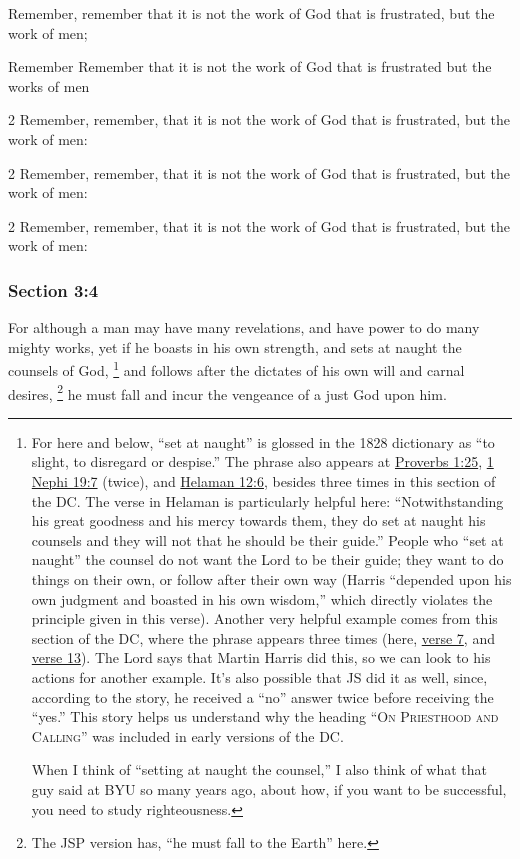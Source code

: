 		Remember, remember that it is not the work of God that is frustrated, but the work of men;

		\begin{framed}
		\scriptsize
			\begin{compactdesc}
				\item[JSP] Remember Remember that it is not the work of God that is frustrated but the works of men
				\item[BC] 2 Remember, remember, that it is not the work of God that is frustrated, but the work of men:
				\item[DC 1835] 2 Remember, remember, that it is not the work of God that is frustrated, but the work of men:
				\item[DC 1844] 2 Remember, remember, that it is not the work of God that is frustrated, but the work of men:
			\end{compactdesc}
		\end{framed}

	\subsubsection{Section 3:4} %
		\label{DC3-4}

		For although a man may have many revelations, and have power to do many mighty works, yet if he boasts in his own strength, and sets at naught the counsels of God,%
			\footnote{%
				For here and below, ``set at naught'' is glossed in the 1828 dictionary as ``to slight, to disregard or despise.'' The phrase also appears at \hyperref[PROVERBS-1-25]{Proverbs 1:25}, \hyperref[1NEPHI-19-7]{1 Nephi 19:7} (twice), and \hyperref[HELAMAN-12-6]{Helaman 12:6}, besides three times in this section of the DC. The verse in Helaman is particularly helpful here: ``Notwithstanding his great goodness and his mercy towards them, they do set at naught his counsels and they will not that he should be their guide.'' People who ``set at naught'' the counsel do not want the Lord to be their guide; they want to do things on their own, or follow after their own way (Harris ``depended upon his own judgment and boasted in his own wisdom,'' which directly violates the principle given in this verse). Another very helpful example comes from this section of the DC, where the phrase appears three times (here, \hyperref[DC3-7]{verse 7}, and \hyperref[DC3-13]{verse 13}). The Lord says that Martin Harris did this, so we can look to his actions for another example. It's also possible that JS did it as well, since, according to the story, he received a ``no'' answer twice before receiving the ``yes.'' This story helps us understand why the heading ``\textsc{On Priesthood and Calling}'' was included in early versions of the DC. 
				
				When I think of ``setting at naught the counsel,'' I also think of what that guy said at BYU so many years ago, about how, if you want to be successful, you need to study righteousness.
				}
		and follows after the dictates of his own will and carnal desires,
			\footnote{%
				The JSP version has, ``he must fall to the Earth'' here.
				}%
		he must fall and incur the vengeance of a just God upon him.

